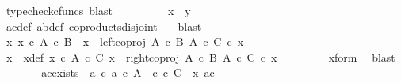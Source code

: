 \begin{isabellebody}
\ {\isacharparenleft}{\kern0pt}typecheck{\isacharunderscore}{\kern0pt}cfuncs{\isacharcomma}{\kern0pt}\ blast{\isacharparenright}{\kern0pt}\isanewline
\ \ \ \ \ \ \isamarkupfalse%
\ \isamarkupfalse%
\ {\isachardoublequoteopen}x\ {\isacharequal}{\kern0pt}\ y{\isachardoublequoteclose}\isanewline
\ \ \ \ \ \ \ \ \isamarkupfalse%
\ a{\isacharprime}{\kern0pt}c{\isacharprime}{\kern0pt}{\isacharunderscore}{\kern0pt}def\ ab{\isacharunderscore}{\kern0pt}def\ coproducts{\isacharunderscore}{\kern0pt}disjoint\ \ \isamarkupfalse%
\ blast\isanewline
\ \ \ \ \isamarkupfalse%
\isanewline
\ \ \isamarkupfalse%
\isanewline
\ \ \ \ \isamarkupfalse%
\ {\isachardoublequoteopen}{\isasymnexists}x{\isacharprime}{\kern0pt}{\isachardot}{\kern0pt}\ x{\isacharprime}{\kern0pt}\ {\isasymin}\isactrlsub c\ A\ {\isasymtimes}\isactrlsub c\ B\ {\isasymand}\ x\ {\isacharequal}{\kern0pt}\ left{\isacharunderscore}{\kern0pt}coproj\ {\isacharparenleft}{\kern0pt}A\ {\isasymtimes}\isactrlsub c\ B{\isacharparenright}{\kern0pt}\ {\isacharparenleft}{\kern0pt}A\ {\isasymtimes}\isactrlsub c\ C{\isacharparenright}{\kern0pt}\ {\isasymcirc}\isactrlsub c\ x{\isacharprime}{\kern0pt}{\isachardoublequoteclose}\isanewline
\ \ \ \ \isamarkupfalse%
\ \isamarkupfalse%
\ x{\isacharprime}{\kern0pt}\ \ x{\isacharprime}{\kern0pt}{\isacharunderscore}{\kern0pt}def{\isacharcolon}{\kern0pt}\ {\isachardoublequoteopen}x{\isacharprime}{\kern0pt}\ {\isasymin}\isactrlsub c\ A\ {\isasymtimes}\isactrlsub c\ C{\isachardoublequoteclose}\ {\isachardoublequoteopen}x\ {\isacharequal}{\kern0pt}\ right{\isacharunderscore}{\kern0pt}coproj\ {\isacharparenleft}{\kern0pt}A\ {\isasymtimes}\isactrlsub c\ B{\isacharparenright}{\kern0pt}\ {\isacharparenleft}{\kern0pt}A\ {\isasymtimes}\isactrlsub c\ C{\isacharparenright}{\kern0pt}\ {\isasymcirc}\isactrlsub c\ x{\isacharprime}{\kern0pt}{\isachardoublequoteclose}\isanewline
\ \ \ \ \ \ \isamarkupfalse%
\ \ x{\isacharunderscore}{\kern0pt}form\ \isamarkupfalse%
\ blast\isanewline
\ \ \ \ \isamarkupfalse%
\ \isamarkupfalse%
\ ac{\isacharunderscore}{\kern0pt}exists{\isacharcolon}{\kern0pt}\ {\isachardoublequoteopen}{\isasymexists}\ a\ c{\isachardot}{\kern0pt}\ a\ {\isasymin}\isactrlsub c\ A\ {\isasymand}\ c\ {\isasymin}\isactrlsub c\ C\ {\isasymand}\ x{\isacharprime}{\kern0pt}\ {\isacharequal}{\kern0pt}{\isasymlangle}a{\isacharcomma}{\kern0pt}c{\isasymrangle}{\isachardoublequoteclose}\isanewline

\end{isabellebody}
